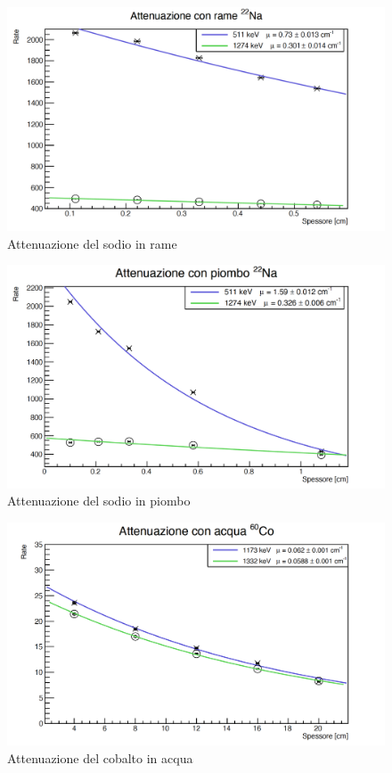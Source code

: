 \documentclass[a4paper,10pt]{article}
\begin{document}
\begin{figure}[H]
    \centering
    \includegraphics[scale=0.45]{grafici/attenuazionesodiorame}
    \caption{Attenuazione del sodio in rame}
\end{figure}

\begin{figure}[H]
    \centering
    \includegraphics[scale=0.45]{grafici/attenuazionesodiopiombo}
    \caption{Attenuazione del sodio in piombo}
\end{figure}

\begin{figure}[H]
    \centering
    \includegraphics[scale=0.45]{grafici/attenuazionecobaltoacqua}
    \caption{Attenuazione del cobalto in acqua}
\end{figure}
\end{document}
